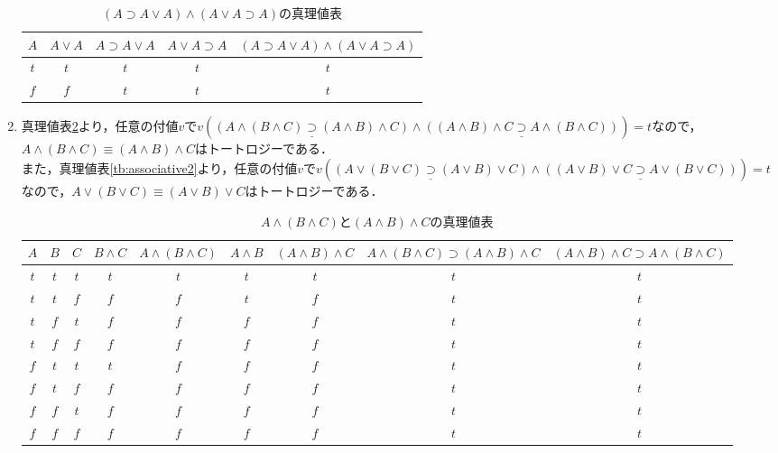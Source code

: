 \documentclass[11pt,dvipdfmx]{jreport}
\begin{document}
\begin{enumerate}
\begin{table}[!htbp]
 \centering
 \caption{$(A \supset A \lor A) \land (A \lor A \supset A)$の真理値表}
 \vspace{3mm}
 \begin{tabular}{c|c|c|c|c}
   $A$ & $A \lor A$ & $A \supset A \lor A$ & $A \lor A \supset A$ & $(A \supset A \lor A) \land (A \lor A \supset A)$ \\ \hline
   $t$ & $t$ & $t$ & $t$ & $t$ \\ \hline
   $f$ & $f$ & $t$ & $t$ & $t$ 
 \end{tabular}
 \label{tb:id2}
\end{table}
 \item 真理値表\ref{tb:associative1}より，任意の付値$v$で$v(\underline{(A \land (B \land C) \supset (A \land B) \land C)} \land \underline{((A \land B) \land C \supset A \land (B \land C))}) = t$なので，$A \land (B \land C) \equiv (A \land B) \land C$はトートロジーである．\\
  また，真理値表\ref{tb:associative2}より，任意の付値$v$で$v(\underline{(A \lor (B \lor C) \supset (A \lor B) \lor C)} \land \underline{((A \lor B) \lor C \supset A \lor (B \lor C))}) = t$なので，$A \lor (B \lor C) \equiv (A \lor B) \lor C$はトートロジーである．\\
\begin{table}[!htbp]
  {\small
    \caption{$A \land (B \land C)$と$(A \land B) \land C$の真理値表}
    \vspace{3mm}
    \begin{tabular}{c|c|c|c|c|c|c|c|c}
      $A$ & $B$ & $C$ & $B \land C$ & $A \land (B \land C)$ & $A \land B$ & $(A \land B) \land C$ & $A \land (B \land C) \supset (A \land B) \land C$ & $(A \land B) \land C \supset A \land (B \land C)$\\ \hline
      $t$ & $t$ & $t$ & $t$ & $t$ & $t$ & $t$ & $t$ & $t$ \\ \hline
      $t$ & $t$ & $f$ & $f$ & $f$ & $t$ & $f$ & $t$ & $t$ \\ \hline
      $t$ & $f$ & $t$ & $f$ & $f$ & $f$ & $f$ & $t$ & $t$ \\ \hline
      $t$ & $f$ & $f$ & $f$ & $f$ & $f$ & $f$ & $t$ & $t$ \\ \hline
      $f$ & $t$ & $t$ & $t$ & $f$ & $f$ & $f$ & $t$ & $t$ \\ \hline
      $f$ & $t$ & $f$ & $f$ & $f$ & $f$ & $f$ & $t$ & $t$ \\ \hline
      $f$ & $f$ & $t$ & $f$ & $f$ & $f$ & $f$ & $t$ & $t$ \\ \hline
      $f$ & $f$ & $f$ & $f$ & $f$ & $f$ & $f$ & $t$ & $t$
    \end{tabular}
    \label{tb:associative1}
  }
\end{table}


\end{enumerate}
\end{document}
